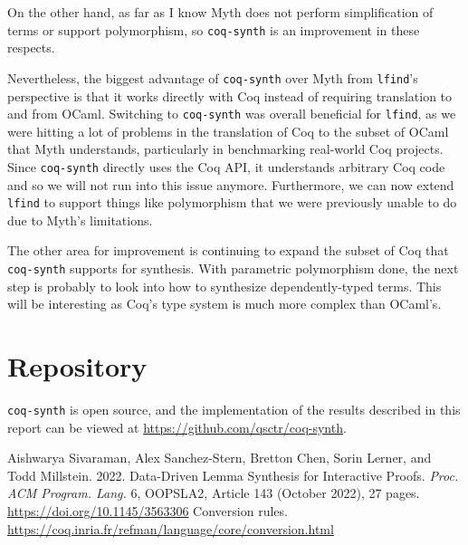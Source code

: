 \documentclass[11pt]{article}
\begin{document}
On the other hand, as far as I know Myth does not perform simplification of terms or support polymorphism, so \texttt{coq-synth} is an improvement in these respects.

Nevertheless, the biggest advantage of \texttt{coq-synth} over Myth from \texttt{lfind}'s perspective is that it works directly with Coq instead of requiring translation to and from OCaml. Switching to \texttt{coq-synth} was overall beneficial for \texttt{lfind}, as we were hitting a lot of problems in the translation of Coq to the subset of OCaml that Myth understands, particularly in benchmarking real-world Coq projects. Since \texttt{coq-synth} directly uses the Coq API, it understands arbitrary Coq code and so we will not run into this issue anymore. Furthermore, we can now extend \texttt{lfind} to support things like polymorphism that we were previously unable to do due to Myth's limitations.

The other area for improvement is continuing to expand the subset of Coq that \texttt{coq-synth} supports for synthesis. With parametric polymorphism done, the next step is probably to look into how to synthesize dependently-typed terms. This will be interesting as Coq's type system is much more complex than OCaml's.

\section{Repository}

\texttt{coq-synth} is open source, and the implementation of the results described in this report can be viewed at \url{https://github.com/qsctr/coq-synth}.

\begin{thebibliography}{9}
Aishwarya Sivaraman, Alex Sanchez-Stern, Bretton Chen, Sorin Lerner, and Todd Millstein. 2022. Data-Driven
Lemma Synthesis for Interactive Proofs. \textit{Proc. ACM Program. Lang.} 6, OOPSLA2, Article 143 (October 2022),
27 pages. \url{https://doi.org/10.1145/3563306}
Conversion rules. \url{https://coq.inria.fr/refman/language/core/conversion.html}
\end{thebibliography}
\end{document}

